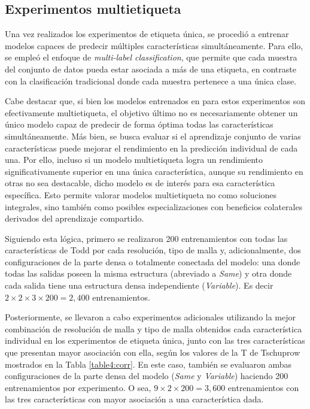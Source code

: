 \subsection{Experimentos multietiqueta}
Una vez realizados los experimentos de etiqueta única, se procedió a entrenar modelos capaces de predecir múltiples características simultáneamente. Para ello, se empleó el enfoque de \textit{multi-label classification}, que permite que cada muestra del conjunto de datos pueda estar asociada a más de una etiqueta, en contraste con la clasificación tradicional donde cada muestra pertenece a una única clase. 

Cabe destacar que, si bien los modelos entrenados en para estos experimentos son efectivamente multietiqueta, el objetivo último no es necesariamente obtener un único modelo capaz de predecir de forma óptima todas las características simultáneamente. Más bien, se busca evaluar si el aprendizaje conjunto de varias características puede mejorar el rendimiento en la predicción individual de cada una. Por ello, incluso si un modelo multietiqueta logra un rendimiento significativamente superior en una única característica, aunque su rendimiento en otras no sea destacable, dicho modelo es de interés para esa característica específica. Esto permite valorar modelos multietiqueta no como soluciones integrales, sino también como posibles especializaciones con beneficios colaterales derivados del aprendizaje compartido.

Siguiendo esta lógica, primero se realizaron 200 entrenamientos con todas las características de Todd por cada resolución, tipo de malla y, adicionalmente, dos configuraciones de la parte densa o totalmente conectada del modelo: una donde todas las salidas poseen la misma estructura (abreviado a \textit{Same}) y otra donde cada salida tiene una estructura densa independiente (\textit{Variable}). Es decir $2 \times 2 \times 3 \times 200 = 2,400$ entrenamientos.

Posteriormente, se llevaron a cabo experimentos adicionales utilizando la mejor combinación de resolución de malla y tipo de malla obtenidos cada característica individual en los experimentos de etiqueta única, junto con las tres características que presentan mayor asociación con ella, según los valores de la T de Tschuprow mostrados en la Tabla \ref{table4:corr}. En este caso, también se evaluaron ambas configuraciones de la parte densa del modelo (\textit{Same} y \textit{Variable}) haciendo 200 entrenamientos por experimento. O sea, $9 \times 2 \times 200 = 3,600$ entrenamientos con las tres características con mayor asociación a una característica dada.

